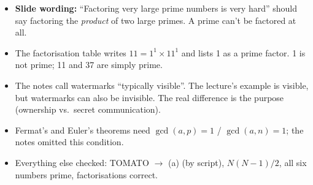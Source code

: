 \begin{fixbox}
\begin{itemize}
  \item \textbf{Slide wording:} ``Factoring very large prime numbers is very hard'' should say factoring the \emph{product} of two large primes. A prime can't be factored at all.
  \item The factorisation table writes $11 = 1^1 \times 11^1$ and lists 1 as a prime factor. 1 is not prime; 11 and 37 are simply prime.
  \item The notes call watermarks ``typically visible''. The lecture's example is visible, but watermarks can also be invisible. The real difference is the purpose (ownership vs.\ secret communication).
  \item Fermat's and Euler's theorems need $\gcd(a,p) = 1$ / $\gcd(a,n) = 1$; the notes omitted this condition.
  \item Everything else checked: TOMATO $\to$ (a) (by script), $N(N-1)/2$, all six numbers prime, factorisations correct.
\end{itemize}
\end{fixbox}
